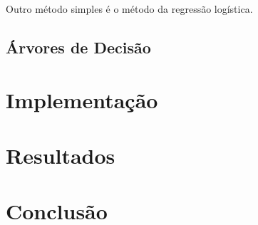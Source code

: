 \documentclass[12pt,a4paper,oneside]{article}
\begin{document}
Outro método simples é o método da regressão logística.

\subsection{Árvores de Decisão}

\lipsum[0]

\lipsum[1]

\lipsum[2]

\lipsum[3]

\lipsum[4]

\lipsum[5]



\section{Implementação}
\label{sec:imp}

\lipsum[0]

\lipsum[1]

\lipsum[2]


\section{Resultados}
\label{sec:res}

\lipsum[0]

\lipsum[1]

\lipsum[2]

\lipsum[3]

\lipsum[4]

\lipsum[5]



\section{Conclusão}
\label{sec:con}

\lipsum[0]

\lipsum[1]

\lipsum[2]




\end{document}
